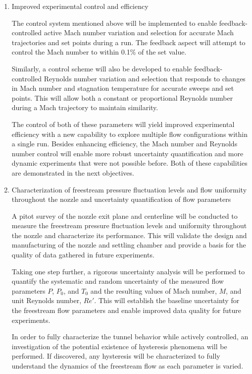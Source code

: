 \begin{enumerate}[listparindent=\parindent]
    \item Improved experimental control and efficiency
            
        The control system mentioned above will be implemented to enable feedback-controlled active Mach number variation and selection for accurate Mach trajectories and set points during a run. The feedback aspect will attempt to control the Mach number to within 0.1\% of the set value.
        
        Similarly, a control scheme will also be developed to enable feedback-controlled Reynolds number variation and selection that responds to changes in Mach number and stagnation temperature for accurate sweeps and set points. This will allow both a constant or proportional Reynolds number during a Mach trajectory to maintain similarity.

        The control of both of these parameters will yield improved experimental efficiency with a new capability to explore multiple flow configurations within a single run. Besides enhancing efficiency, the Mach number and Reynolds number control will enable more robust uncertainty quantification and more dynamic experiments that were not possible before. Both of these capabilities are demonstrated in the next objectives.

    \item Characterization of freestream pressure fluctuation levels and flow uniformity throughout the nozzle and uncertainty quantification of flow parameters

        A pitot survey of the nozzle exit plane and centerline will be conducted to measure the freestream pressure fluctuation levels and uniformity throughout the nozzle and characterize its performance. This will validate the design and manufacturing of the nozzle and settling chamber and provide a basis for the quality of data gathered in future experiments.

        Taking one step further, a rigorous uncertainty analysis will be performed to quantify the systematic and random uncertainty of the measured flow parameters $P$, $P_0$, and $T_0$ and the resulting values of Mach number, $M$, and unit Reynolds number, $Re'$. This will establish the baseline uncertainty for the freestream flow parameters and enable improved data quality for future experiments.

        In order to fully characterize the tunnel behavior while actively controlled, an investigation of the potential existence of hysteresis phenomena will be performed. If discovered, any hysteresis will be characterized to fully understand the dynamics of the freestream flow as each parameter is varied.


\end{enumerate}
